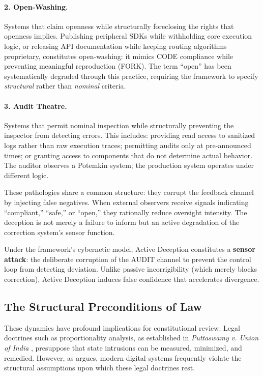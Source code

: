 \documentclass{article}
\begin{document}
\paragraph{2. Open-Washing.} Systems that claim openness while structurally foreclosing the rights that openness implies. Publishing peripheral SDKs while withholding core execution logic, or releasing API documentation while keeping routing algorithms proprietary, constitutes open-washing: it mimics CODE compliance while preventing meaningful reproduction (FORK). The term ``open'' has been systematically degraded through this practice, requiring the framework to specify \textit{structural} rather than \textit{nominal} criteria.

\paragraph{3. Audit Theatre.} Systems that permit nominal inspection while structurally preventing the inspector from detecting errors. This includes: providing read access to sanitized logs rather than raw execution traces; permitting audits only at pre-announced times; or granting access to components that do not determine actual behavior. The auditor observes a Potemkin system; the production system operates under different logic.

These pathologies share a common structure: they corrupt the feedback channel by injecting false negatives. When external observers receive signals indicating ``compliant,'' ``safe,'' or ``open,'' they rationally reduce oversight intensity. The deception is not merely a failure to inform but an active degradation of the correction system's sensor function.

Under the framework's cybernetic model, Active Deception constitutes a \textbf{sensor attack}: the deliberate corruption of the AUDIT channel to prevent the control loop from detecting deviation. Unlike passive incorrigibility (which merely blocks correction), Active Deception induces false confidence that accelerates divergence.

\subsection{The Structural Preconditions of Law}
\label{subsec:rule-of-ledger}

These dynamics have profound implications for constitutional review. Legal doctrines such as proportionality analysis, as established in \textit{Puttaswamy v. Union of India} \citep{puttaswamy2017}, presuppose that state intrusions can be measured, minimized, and remedied. However, as \citet{bhatia2019} argues, modern digital systems frequently violate the structural assumptions upon which these legal doctrines rest.
\end{document}
